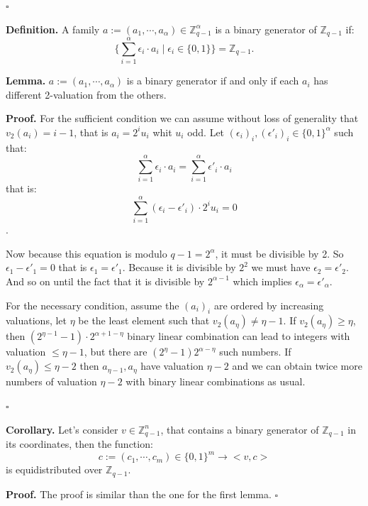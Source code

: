 \documentclass{article}
\begin{document}
\hfill $\square$

\vspace{0.3cm}

\textbf{Definition.}
A family $a:=(a_1,\cdots,a_{\alpha}) \in \mathbb{Z}_{q-1}^{\alpha}$ is a binary generator of $\mathbb{Z}_{q-1}$ if:
\[
\{\sum_{i=1}^{\alpha} \epsilon_i \cdot a_i \mid \epsilon_i \in \{0,1\}\} = \mathbb{Z}_{q-1}.
\]

\vspace{0.3cm}

\textbf{Lemma.}
$a:=(a_1,\cdots,a_{\alpha})$ is a binary generator if and only if each $a_i$ has different 2-valuation  from the others.

\vspace{0.3cm}

\textbf{Proof.} 
For the sufficient condition we can assume without loss of generality that $v_2(a_i)=i-1$, that is $a_i = 2^i u_i$ whit $u_i$ odd.
Let $(\epsilon_i)_i, (\epsilon'_i)_i \in \{0,1\}^{\alpha}$ such that:
\[
\sum_{i=1}^{\alpha} \epsilon_i \cdot a_i =\sum_{i=1}^{\alpha} \epsilon'_i \cdot a_i
\]
that is:
\[
\sum_{i=1}^{\alpha} (\epsilon_i -\epsilon'_i)\cdot 2^i u_i =0 
\].

Now because this equation is modulo $q-1=2^{\alpha}$, it must be divisible by 2. So $\epsilon_1 -\epsilon'_1=0$ that is $\epsilon_1 =\epsilon'_1$. Because it is divisible by $2^2$ we must have $\epsilon_2 =\epsilon'_2$. And so on until the fact that it is divisible by $2^{\alpha -1}$ which implies $\epsilon_{\alpha} =\epsilon'_{\alpha}$.

\vspace{0.3cm}

For the necessary condition, assume the $(a_i)_i$ are ordered by increasing valuations, let $\eta$ be the least element such that $v_2(a_{\eta}) \neq \eta -1$. If $ v_2(a_{\eta}) \geq \eta$, then $(2 ^{\eta-1} - 1)\cdot 2^{\alpha +1 -\eta}$ binary linear combination can lead to integers with valuation $\leq \eta-1$, but there are $(2^{\eta}-1) 2^{\alpha-\eta}$ such numbers.  If $ v_2(a_{\eta}) \leq \eta -2 $ then $a_{\eta-1}, a_{\eta}$ have valuation $\eta-2$ and we can obtain twice more numbers of valuation $\eta -2$ with binary linear combinations as usual.

\hfill $\square$

\vspace{0.3cm}

\textbf{Corollary.}
Let's consider $v \in \mathbb{Z}_{q-1}^n$, that contains a binary generator of $\mathbb{Z}_{q-1}$ in its coordinates, then the function:
\[
c:=(c_1,\cdots,c_m) \in \{0,1\}^m \to <v,c>
\]
is equidistributed over $\mathbb{Z}_{q-1}$.

\vspace{0.3cm}

\textbf{Proof.} The proof is similar than the one for the first lemma. \hfill $\square$
\end{document}
